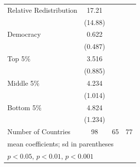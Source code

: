 \begin{table}[htbp]
\begin{tabular}{l*{3}{c}}
\addlinespace
Relative Redistribution&       17.21         &                     &                     \\
                    &     (14.88)         &                     &                     \\
\addlinespace
Democracy           &       0.622         &                     &                     \\
                    &     (0.487)         &                     &                     \\
\addlinespace
Top 5\%             &       3.516         &                     &                     \\
                    &     (0.885)         &                     &                     \\
\addlinespace
Middle 5\%          &       4.234         &                     &                     \\
                    &     (1.014)         &                     &                     \\
\addlinespace
Bottom 5\%          &       4.824         &                     &                     \\
                    &     (1.234)         &                     &                     \\
\midrule
Number of Countries &          98         &          65         &          77         \\
\bottomrule
\multicolumn{4}{l}{\footnotesize mean coefficients; sd in parentheses}\\
\multicolumn{4}{l}{\footnotesize \sym{*} \(p<0.05\), \sym{**} \(p<0.01\), \sym{***} \(p<0.001\)}\\
\end{tabular}
\end{table}
